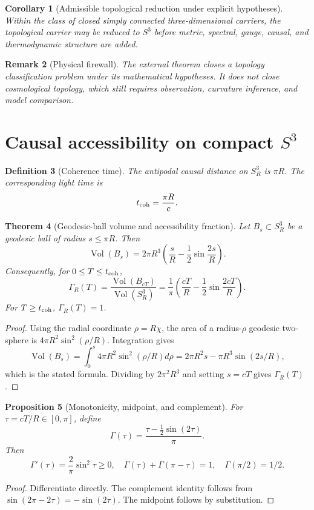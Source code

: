 \documentclass[11pt,a4paper]{article}
\newtheorem{theorem}{Theorem}[section]
\newtheorem{proposition}[theorem]{Proposition}
\newtheorem{corollary}[theorem]{Corollary}
\newtheorem{definition}[theorem]{Definition}
\newtheorem{remark}[theorem]{Remark}
\newcommand{\Vol}{\operatorname{Vol}}
\begin{document}
\begin{corollary}[Admissible topological reduction under explicit hypotheses]
Within the class of closed simply connected three-dimensional carriers, the topological carrier may be reduced to $S^3$ before metric, spectral, gauge, causal, and thermodynamic structure are added.
\end{corollary}

\begin{remark}[Physical firewall]
The external theorem closes a topology classification problem under its mathematical hypotheses.  It does not close cosmological topology, which still requires observation, curvature inference, and model comparison.
\end{remark}

\section{Causal accessibility on compact $S^3$}

\begin{definition}[Coherence time]
The antipodal causal distance on $S^3_R$ is $\pi R$.  The corresponding light time is
\[
t_{\rm coh}=\frac{\pi R}{c}.
\]
\end{definition}

\begin{theorem}[Geodesic-ball volume and accessibility fraction]
Let $B_s\subset S^3_R$ be a geodesic ball of radius $s\le\pi R$.  Then
\[
\Vol(B_s)=2\pi R^3\left(\frac{s}{R}-\frac12\sin\frac{2s}{R}\right).
\]
Consequently, for $0\le T\le t_{\rm coh}$,
\[
\Gamma_R(T)=\frac{\Vol(B_{cT})}{\Vol(S^3_R)}
=\frac{1}{\pi}\left(\frac{cT}{R}-\frac12\sin\frac{2cT}{R}\right).
\]
For $T\ge t_{\rm coh}$, $\Gamma_R(T)=1$.
\end{theorem}
\begin{proof}
Using the radial coordinate $\rho=R\chi$, the area of a radius-$\rho$ geodesic two-sphere is $4\pi R^2\sin^2(\rho/R)$.  Integration gives
\[
\Vol(B_s)=\int_0^s4\pi R^2\sin^2(\rho/R)d\rho
=2\pi R^2s-\pi R^3\sin(2s/R),
\]
which is the stated formula.  Dividing by $2\pi^2R^3$ and setting $s=cT$ gives $\Gamma_R(T)$.\end{proof}

\begin{proposition}[Monotonicity, midpoint, and complement]
For $\tau=cT/R\in[0,\pi]$, define
\[
\Gamma(\tau)=\frac{\tau-\frac12\sin(2\tau)}{\pi}.
\]
Then
\[
\Gamma'(\tau)=\frac{2}{\pi}\sin^2\tau\ge0,
\quad
\Gamma(\tau)+\Gamma(\pi-\tau)=1,
\quad
\Gamma(\pi/2)=1/2.
\]
\end{proposition}
\begin{proof}
Differentiate directly.  The complement identity follows from $\sin(2\pi-2\tau)=-\sin(2\tau)$.  The midpoint follows by substitution.\end{proof}
\end{document}
